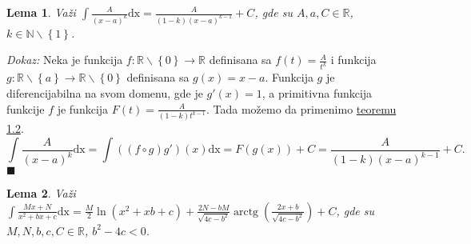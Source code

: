 \documentclass{article}
\newtheorem{lema}{Lema}[section]
\DeclareMathOperator{\arctg}{arctg}
\begin{document}
\begin{lemabox}
    \label{lema_1.2}
    \begin{lema}
        Važi $\displaystyle\int \frac{A}{\left(x-a\right)^k}\text{dx}=\frac{A}{\left(1-k\right)\left(x-a\right)^{k-1}}+ C$, gde su $A,a,C\in \mathbb{R}$, $k\in\mathbb{N}\backslash\left\{1\right\}$.
    \end{lema}
\end{lemabox}

\textit{Dokaz:} Neka je funkcija $f:\mathbb{R}\backslash\left\{0\right\}\longrightarrow\mathbb{R}$ definisana sa
$f\left(t\right)=\frac{A}{t^k}$ i funkcija $g:\mathbb{R}\backslash\left\{a\right\}\longrightarrow\mathbb{R}\backslash\left\{0\right\}$
definisana sa $g\left(x\right)=x-a$. Funkcija $g$ je diferencijabilna na svom domenu, gde je $g'\left(x\right)=1$, a primitivna funkcija
funkcije $f$ je funkcija $F\left(t\right)=\frac{A}{\left(1-k\right)t^{k-1}}$. Tada možemo da primenimo \hyperref[teorema_1.2]{teoremu 1.2}.
$$\int \frac{A}{\left(x-a\right)^k}\text{dx} = \int \left(\left(f\circ g\right) g'\right)\left(x\right)\text{dx} = F\left(g\left(x\right)\right) + C= \frac{A}{\left(1-k\right)\left(x-a\right)^{k-1}}+ C.$$
\null\hfill$\blacksquare$\par

\begin{lemabox}
    \label{lema_1.3}
    \begin{lema}
        Važi $\displaystyle\int \frac{Mx+N}{x^2+bx+c}\text{dx}= \frac{M}{2}\ln\left(x^2+xb+c\right)+\frac{2N-bM}{\sqrt{4c-b^2}}\arctg\left({\frac{2x+b}{\sqrt{4c-b^2}}}\right)+ C$, gde su $M,N,b,c,C\in\mathbb{R}$, $b^2 - 4c < 0$.
    \end{lema}
\end{lemabox}
\end{document}

